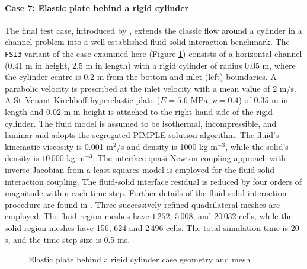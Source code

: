 \documentclass[sn-mathphys,Numbered]{sn-jnl}%
\begin{document}
\paragraph{Case 7: Elastic plate behind a rigid cylinder}
The final test case, introduced by \citet{Turek2006}, extends the classic flow around a cylinder in a channel problem \citep{Ferziger2002} into a well-established fluid-solid interaction benchmark.
The \texttt{FSI3} variant of the case examined here (Figure \ref{fig:hronTurek-mesh}) consists of a horizontal channel (0.41 m in height, 2.5 m in length) with a rigid cylinder of radius 0.05 m, where the cylinder centre is 0.2 m from the bottom and inlet (left) boundaries.
A parabolic velocity is prescribed at the inlet velocity with a mean value of 2 m/s.
A St.\,Venant-Kirchhoff hyperelastic plate ($E = 5.6$ MPa, $\nu = 0.4$) of 0.35 m in length and 0.02 m in height is attached to the right-hand side of the rigid cylinder.
The fluid model is assumed to be isothermal, incompressible, and laminar and adopts the segregated PIMPLE solution algorithm.
The fluid's kinematic viscosity is 0.001 m$^2$/s and density is 1000 kg m$^{-3}$, while the solid's density is $10\,000$ kg m$^{-3}$.
The interface quasi-Newton coupling approach with inverse Jacobian from a least-squares model \cite{Degroote2009} is employed for the fluid-solid interaction coupling.
The fluid-solid interface residual is reduced by four orders of magnitude within each time step.
Further details of the fluid-solid interaction procedure are found in \citet{Tukovic2018}.
Three successively refined quadrilateral meshes are employed:
The fluid region meshes have $1\,252$, $5\,008$, and $20\,032$ cells, while the solid region meshes have 156,  624 and $2\,496$ cells.
The total simulation time is 20 s, and the time-step size is 0.5 ms. 
\begin{figure}[htbp]
   \centering
   \caption{Elastic plate behind a rigid cylinder case geometry and mesh}
   \label{fig:hronTurek-mesh}
\end{figure}
\end{document}
